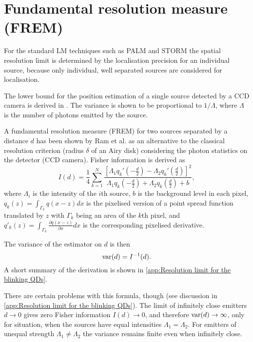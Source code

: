 
\section{Fundamental resolution measure (FREM)}

For the standard LM techniques such as PALM and STORM  the spatial resolution limit is determined by the localisation precision for an individual source, because only individual, well separated sources are considered for localisation. 

The \CR lower bound for the position estimation of a single source detected by a CCD camera is derived in \cite{Ram2006,Ram2006b}. The variance is shown to be proportional to $1/\Lambda$, where $\Lambda$ is the number of photons emitted by the source. 

A fundamental resolution measure (FREM) for two sources separated by a distance $d$ has been shown by Ram et al. \cite{Ram2006} as an alternative to the classical resolution criterion (radius $\delta$ of an Airy disk) considering the photon statistics on the detector (CCD camera). Fisher information is derived as
%
\begin{equation}
	I(d)=\frac{1}{4}\sum_{k=1}^N\frac{\left[\Lambda_1q_k'(-\frac{d}{2})-\Lambda_2q_k'(\frac{d}{2})\right]^2}{\Lambda_1q_k(-\frac{d}{2})+\Lambda_2q_k(\frac{d}{2})+b},
	\label{eq:Ram FREM}
\end{equation}
%
where $\Lambda_i$ is the intensity of the $i$th source, $b$ is the background level in each pixel, $q_k(z)=\int_{\Gamma_k}q(x-z)dx$ is the pixelised version of a point spread function translated by $z$ with $\Gamma_k$ being an area of the $k$th pixel, and $q'_k(z)=\int_{\Gamma_k}\frac{\partial q(x-z)}{\partial x}dx$ is the corresponding pixelised derivative. 

The variance of the estimator on $d$ is then 
%
\begin{equation}
	\mathrm{var}(d)=I^{-1}(d).
\end{equation}
%
A short summary of the derivation is shown in \autoref{app:Resolution limit for the blinking QDs}. 

There are certain problems with this formula, though (see discussion in \autoref{app:Resolution limit for the blinking QDs}). The limit of infinitely close emitters $d\rightarrow0$ gives  zero Fisher information $I(d)\rightarrow0$, and therefore $\mathrm{var}(d)\rightarrow\infty$, only for situation, when the sources have equal intensities $\Lambda_1=\Lambda_2$. For emitters of unequal strength $\Lambda_1\neq\Lambda_2$ the variance remains finite even when infinitely close. 

